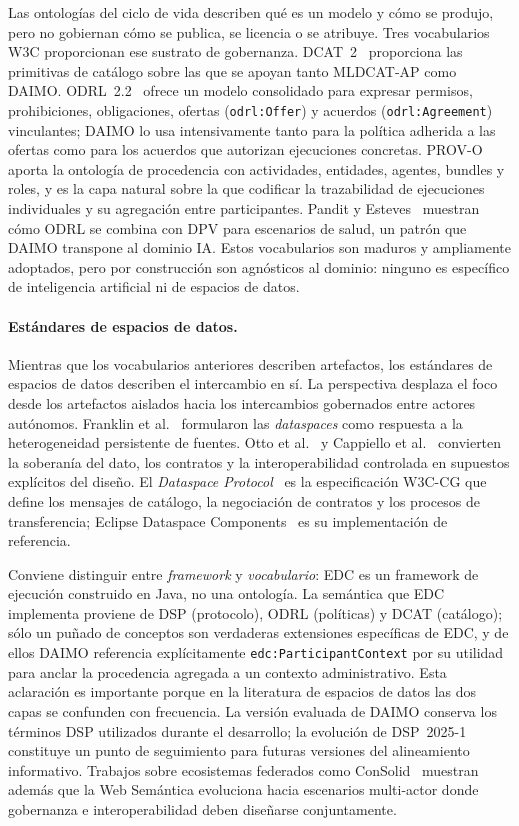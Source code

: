 \documentclass[Afour,sagev,times]{sagej}
\newcommand{\code}[1]{\texttt{#1}}
\begin{document}
Las ontologías del ciclo de vida describen qué es un modelo y cómo se produjo, pero no gobiernan cómo se publica, se licencia o se atribuye. Tres vocabularios W3C proporcionan ese sustrato de gobernanza. DCAT~2~\cite{dcat2} proporciona las primitivas de catálogo sobre las que se apoyan tanto MLDCAT-AP como DAIMO. ODRL~2.2~\cite{odrl22} ofrece un modelo consolidado para expresar permisos, prohibiciones, obligaciones, ofertas (\code{odrl:Offer}) y acuerdos (\code{odrl:Agreement}) vinculantes; DAIMO lo usa intensivamente tanto para la política adherida a las ofertas como para los acuerdos que autorizan ejecuciones concretas. PROV-O~\cite{provo} aporta la ontología de procedencia con actividades, entidades, agentes, bundles y roles, y es la capa natural sobre la que codificar la trazabilidad de ejecuciones individuales y su agregación entre participantes. Pandit y Esteves~\cite{pandit-esteves} muestran cómo ODRL se combina con DPV para escenarios de salud, un patrón que DAIMO transpone al dominio IA. Estos vocabularios son maduros y ampliamente adoptados, pero por construcción son agnósticos al dominio: ninguno es específico de inteligencia artificial ni de espacios de datos.

\paragraph{Estándares de espacios de datos.}

Mientras que los vocabularios anteriores describen artefactos, los estándares de espacios de datos describen el intercambio en sí. La perspectiva desplaza el foco desde los artefactos aislados hacia los intercambios gobernados entre actores autónomos. Franklin et al.~\cite{franklin05} formularon las \emph{dataspaces} como respuesta a la heterogeneidad persistente de fuentes. Otto et al.~\cite{otto19} y Cappiello et al.~\cite{cappiello22} convierten la soberanía del dato, los contratos y la interoperabilidad controlada en supuestos explícitos del diseño. El \emph{Dataspace Protocol}~\cite{dsp} es la especificación W3C-CG que define los mensajes de catálogo, la negociación de contratos y los procesos de transferencia; Eclipse Dataspace Components~\cite{edc} es su implementación de referencia.

Conviene distinguir entre \emph{framework} y \emph{vocabulario}: EDC es un framework de ejecución construido en Java, no una ontología. La semántica que EDC implementa proviene de DSP (protocolo), ODRL (políticas) y DCAT (catálogo); sólo un puñado de conceptos son verdaderas extensiones específicas de EDC, y de ellos DAIMO referencia explícitamente \code{edc:ParticipantContext} por su utilidad para anclar la procedencia agregada a un contexto administrativo. Esta aclaración es importante porque en la literatura de espacios de datos las dos capas se confunden con frecuencia. La versión evaluada de DAIMO conserva los términos DSP utilizados durante el desarrollo; la evolución de DSP~2025-1~\cite{dsp2025} constituye un punto de seguimiento para futuras versiones del alineamiento informativo. Trabajos sobre ecosistemas federados como ConSolid~\cite{werbrouck24} muestran además que la Web Semántica evoluciona hacia escenarios multi-actor donde gobernanza e interoperabilidad deben diseñarse conjuntamente.
\end{document}
